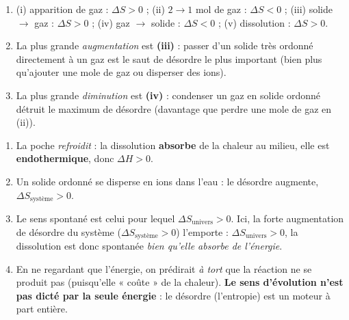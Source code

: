\documentclass[11pt,a4paper]{article}
\newcommand{\dS}{\Delta S}
\newcommand{\dH}{\Delta H}
\newcommand{\rep}[1]{\textcolor{primarydark}{\textbf{#1}}}
\begin{document}
\begin{center}
\end{center}

\begin{correction}
\begin{enumerate}[label=\alph*),leftmargin=2em,topsep=2pt,itemsep=2pt]
  \item (i) apparition de gaz : $\dS>0$ ; (ii) $2\to1$ mol de gaz : $\dS<0$ ;
        (iii) solide $\to$ gaz : $\dS>0$ ; (iv) gaz $\to$ solide : $\dS<0$ ;
        (v) dissolution : $\dS>0$.
  \item La plus grande \emph{augmentation} est \rep{(iii)} : passer d'un solide très ordonné directement
        à un gaz est le saut de désordre le plus important (bien plus qu'ajouter une mole de gaz ou
        disperser des ions).
  \item La plus grande \emph{diminution} est \rep{(iv)} : condenser un gaz en solide ordonné détruit le
        maximum de désordre (davantage que perdre une mole de gaz en (ii)).
\end{enumerate}
\end{correction}

\begin{correction}
\begin{enumerate}[label=\alph*),leftmargin=2em,topsep=2pt,itemsep=2pt]
  \item La poche \emph{refroidit} : la dissolution \textbf{absorbe} de la chaleur au milieu, elle est
        \rep{endothermique}, donc \rep{$\dH>0$}.
  \item Un solide ordonné se disperse en ions dans l'eau : le désordre augmente, \rep{$\dS_{\text{système}}>0$}.
  \item Le sens spontané est celui pour lequel $\dS_{\text{univers}}>0$. Ici, la forte augmentation de
        désordre du système ($\dS_{\text{système}}>0$) l'emporte : \rep{$\dS_{\text{univers}}>0$}, la
        dissolution est donc spontanée \emph{bien qu'elle absorbe de l'énergie}.
  \item En ne regardant que l'énergie, on prédirait \emph{à tort} que la réaction ne se produit pas
        (puisqu'elle « coûte » de la chaleur). \rep{Le sens d'évolution n'est pas dicté par la seule
        énergie} : le désordre (l'entropie) est un moteur à part entière.
\end{enumerate}
\end{correction}
\end{document}
